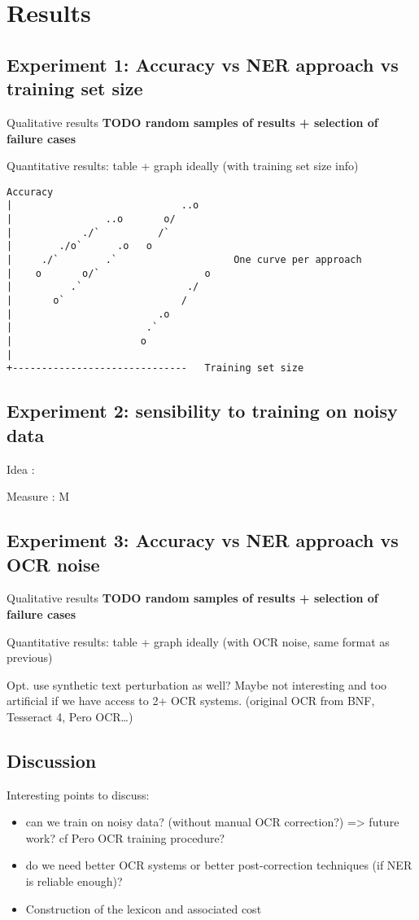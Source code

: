 \section{Results}

\subsection{Experiment 1: Accuracy vs NER approach vs training set size}

Qualitative results
\textbf{TODO random samples of results + selection of failure cases}


Quantitative results: table + graph ideally (with training set size info)

\begin{verbatim}
Accuracy
|                             ..o   
|                ..o       o/       
|            ./`          /`          
|        ./o`      .o   o            
|     ./`        .`                    One curve per approach
|    o       o/`                  o  
|          .`                  ./    
|       o`                    /      
|                         .o        
|                       .`           
|                      o            
|                                   
+------------------------------   Training set size
\end{verbatim}
                                        

\subsection{Experiment 2: sensibility to training on noisy data}
Idea : 

Measure : M


\subsection{Experiment 3: Accuracy vs NER approach vs OCR noise}

Qualitative results
\textbf{TODO random samples of results + selection of failure cases}

Quantitative results: table + graph ideally (with OCR noise, same format as previous)

Opt. use synthetic text perturbation as well? Maybe not interesting and too artificial if we have access to 2+ OCR systems.
(original OCR from BNF, Tesseract 4, Pero OCR…)


\subsection{Discussion}
Interesting points to discuss:
\begin{itemize}
    \item can we train on noisy data? (without manual OCR correction?) => future work? cf Pero OCR training procedure?
    \item do we need better OCR systems or better post-correction techniques (if NER is reliable enough)?
    \item Construction of the lexicon and associated cost
\end{itemize}
